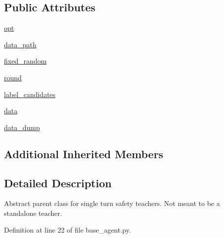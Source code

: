 \subsection*{Public Attributes}
\begin{DoxyCompactItemize}
\item 
\hyperlink{classparlai_1_1tasks_1_1dialogue__safety_1_1base__agent_1_1__BaseSafetyTeacher_a72d5420bf860ece2469f704aff6a4741}{opt}
\item 
\hyperlink{classparlai_1_1tasks_1_1dialogue__safety_1_1base__agent_1_1__BaseSafetyTeacher_acc01c5943e88188386156bee04df64cd}{data\+\_\+path}
\item 
\hyperlink{classparlai_1_1tasks_1_1dialogue__safety_1_1base__agent_1_1__BaseSafetyTeacher_ac288768013bb6f6eae5b6d54e6038c97}{fixed\+\_\+random}
\item 
\hyperlink{classparlai_1_1tasks_1_1dialogue__safety_1_1base__agent_1_1__BaseSafetyTeacher_a3de49870b976f3f356d43d18bdee3206}{round}
\item 
\hyperlink{classparlai_1_1tasks_1_1dialogue__safety_1_1base__agent_1_1__BaseSafetyTeacher_a5f12c3a58104bcbe47d921c5fc74f571}{label\+\_\+candidates}
\item 
\hyperlink{classparlai_1_1tasks_1_1dialogue__safety_1_1base__agent_1_1__BaseSafetyTeacher_aa6fcadfe3658452b2ec1d1ab7fba050e}{data}
\item 
\hyperlink{classparlai_1_1tasks_1_1dialogue__safety_1_1base__agent_1_1__BaseSafetyTeacher_aa689aab73ec3cfd0047bb8ec694893b3}{data\+\_\+dump}
\end{DoxyCompactItemize}
\subsection*{Additional Inherited Members}


\subsection{Detailed Description}
\begin{DoxyVerb}Abstract parent class for single turn safety teachers.
Not meant to be a standalone teacher.
\end{DoxyVerb}
 

Definition at line 22 of file base\+\_\+agent.\+py.



